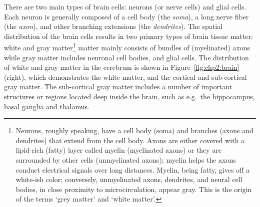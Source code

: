 There are two main types of brain cells: neurons (or nerve cells) and
glial cells. Each neuron is generally composed of a cell body (the
\emph{soma}), a long nerve fiber (the \emph{axon}), and other
branching extensions (the \emph{dendrites}). The spatial distribution
of the brain cells results in two primary types of brain tissue
matter: white and gray matter\footnote{Neurons, roughly speaking, have
  a cell body (soma) and branches (axons and dendrites) that extend
  from the cell body.  Axons are either covered with a lipid-rich
  (fatty) layer called myelin (myelinated axons) or they are
  surrounded by other cells (unmyelinated axons); myelin helps the
  axons conduct electrical signals over long distances. Myelin, being
  fatty, gives off a white-ish color; conversely, unmyelinated axons,
  dendrites, and neural cell bodies, in close proximity to
  microcirculation, appear gray.  This is the origin of the terms
  `grey matter' and `white matter'.} matter mainly consists of
bundles of (myelinated) axons while gray matter includes neuronal cell
bodies, and glial cells. The
distribution of white and gray matter in the cerebrum is shown in
Figure~\ref{fig:chp2:brain} (right), which demonstrates the white
matter, and the cortical and sub-cortical gray matter. The
sub-cortical gray matter includes a number of important structures or
regions located deep inside the brain, such as e.g.~the hippocampus,
basal ganglia and thalamus.
